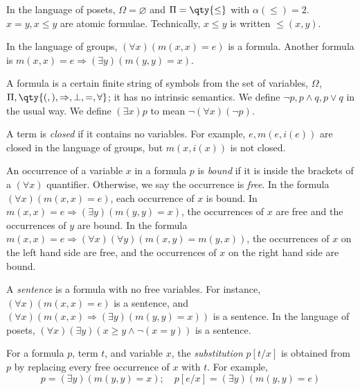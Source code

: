 \begin{example}
    In the language of posets, \( \Omega = \varnothing \) and \( \Pi = \qty{\leq} \) with \( \alpha(\leq) = 2 \).
    \( x = y, x \leq y \) are atomic formulae.
    Technically, \( x \leq y \) is written \( \leq(x, y) \).
\end{example}

\begin{example}
    In the language of groups, \( (\forall x) (m(x,x) = e) \) is a formula.
    Another formula is \( m(x,x) = e \Rightarrow (\exists y) (m(y,y) = x) \).
\end{example}

\begin{remark}
    A formula is a certain finite string of symbols from the set of variables, $\Omega$, $\Pi, \qty{(, ), \implies, \bot, =, \forall}$; it has no intrinsic semantics.
    We define \( \neg p, p \wedge q, p \vee q \) in the usual way.
    We define \( (\exists x) p \) to mean \( \neg(\forall x) (\neg p) \).
\end{remark}

A term is \emph{closed} if it contains no variables.
For example, \( e, m(e,i(e)) \) are closed in the language of groups, but \( m(x,i(x)) \) is not closed.

An occurrence of a variable \( x \) in a formula \( p \) is \emph{bound} if it is inside the brackets of a \( (\forall x) \) quantifier.
Otherwise, we say the occurrence is \emph{free}.
In the formula \( (\forall x)(m(x,x) = e) \), each occurrence of \( x \) is bound.
In \( m(x,x) = e \Rightarrow (\exists y)(m(y,y) = x) \), the occurrences of \( x \) are free and the occurrences of \( y \) are bound.
In the formula \( m(x,x) = e \Rightarrow (\forall x)(\forall y)(m(x,y) = m(y,x)) \), the occurrences of \( x \) on the left hand side are free, and the occurrences of \( x \) on the right hand side are bound.

A \emph{sentence} is a formula with no free variables.
For instance, \( (\forall x)(m(x,x) = e) \) is a sentence, and \( (\forall x)(m(x,x) \Rightarrow (\exists y)(m(y,y) = x)) \) is a sentence.
In the language of posets, \( (\forall x)(\exists y)(x \geq y \wedge \neg(x = y)) \) is a sentence.

For a formula \( p \), term \( t \), and variable \( x \), the \emph{substitution} \( p[t/x] \) is obtained from \( p \) by replacing every free occurrence of \( x \) with \( t \).
For example,
\[ p = (\exists y)(m(y,y) = x);\quad p[e/x] = (\exists y)(m(y,y) = e) \]

